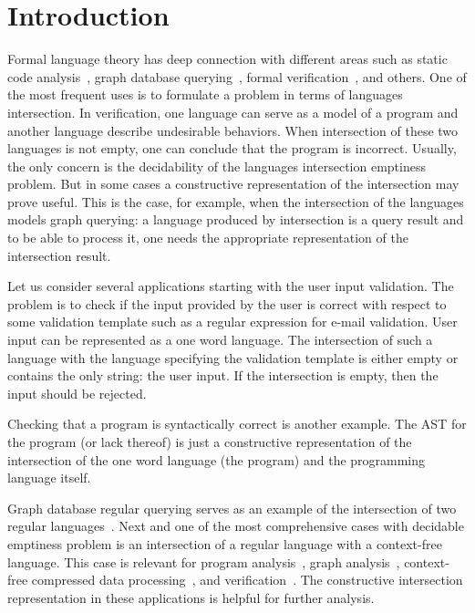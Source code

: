 \section{Introduction}

Formal language theory has deep connection with different areas such as static code analysis~\cite{Reps:1995:PID:199448.199462,vardoulakis2010cfa2,Yan:2011:DCA:2001420.2001440,rehof2001type,lu2013incremental, pratikakis2006existential, zhang2017context}, graph database querying~\cite{hellingsRelational, hellingsPathQuerying,zhang2016context, koschmieder2012regular}, formal verification~\cite{!!!}, and others.
One of the most frequent uses is to formulate a problem in terms of languages intersection.
In verification, one language can serve as a model of a program and another language describe undesirable behaviors.
When intersection of these two languages is not empty, one can conclude that the program is incorrect.
Usually, the only concern is the decidability of the languages intersection emptiness problem.
But in some cases a constructive representation of the intersection may prove useful.
This is the case, for example, when the intersection of the languages models graph querying: a language produced by intersection is a query result and to be able to process it, one needs the appropriate representation of the intersection result.

Let us consider several applications starting with the user input validation.
The problem is to check if the input provided by the user is correct with respect to some validation template such as a regular expression for e-mail validation.
User input can be represented as a one word language.
The intersection of such a language with the language specifying the validation template is either empty or contains the only string: the user input.
If the intersection is empty, then the input should be rejected.

Checking that a program is syntactically correct is another example.
The AST for the program (or lack thereof) is just a constructive representation of the intersection of the one word language (the program) and the programming language itself.

Graph database regular querying serves as an example of the intersection of two regular languages~\cite{ABITEBOUL1999428,koschmieder2012regular,alkhateeb:tel-00293206}.
Next and one of the most comprehensive cases with decidable emptiness problem is an intersection of a regular language with a context-free language.
This case is relevant for program analysis~\cite{Reps:1995:PID:199448.199462,vardoulakis2010cfa2,Yan:2011:DCA:2001420.2001440}, graph analysis~\cite{hellingsPathQuerying,zhang2016context,grigorev2016context}, context-free compressed data processing~\cite{MANETH201819}, and verification~\cite{!!!}.
The constructive intersection representation in these applications is helpful for further analysis.

